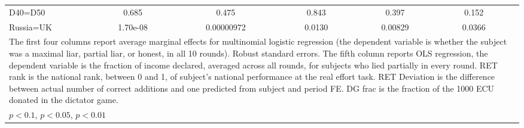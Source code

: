\begin{tabular}{l|cccccccc|cc}
D40=D50         &    0.685         &         &    0.475         &         &    0.843         &         &    0.397         &         &    0.152         &         \\
Russia=UK       & 1.70e-08         &         &0.00000972         &         &   0.0130         &         &  0.00829         &         &   0.0366         &         \\
\hline\hline
\multicolumn{11}{p{16.5cm}}{\tiny The first four columns report average marginal effects for multinomial logistic regression (the dependent variable is whether the subject was a maximal liar, partial liar, or honest, in all 10 rounds). Robust standard errors. The fifth column reports OLS regression, the dependent variable is the fraction of income declared, averaged across all rounds, for subjects who lied partially in every round. RET rank is the national rank, between 0 and 1, of subject's national performance at the real effort task. RET Deviation is the difference between actual number of correct additions and one predicted from subject and period FE. DG frac is the fraction of the 1000 ECU donated in the dictator game.}\\
\multicolumn{11}{l}{\tiny \sym{*} \(p<0.1\), \sym{**} \(p<0.05\), \sym{***} \(p<0.01\)}\\
\end{tabular}